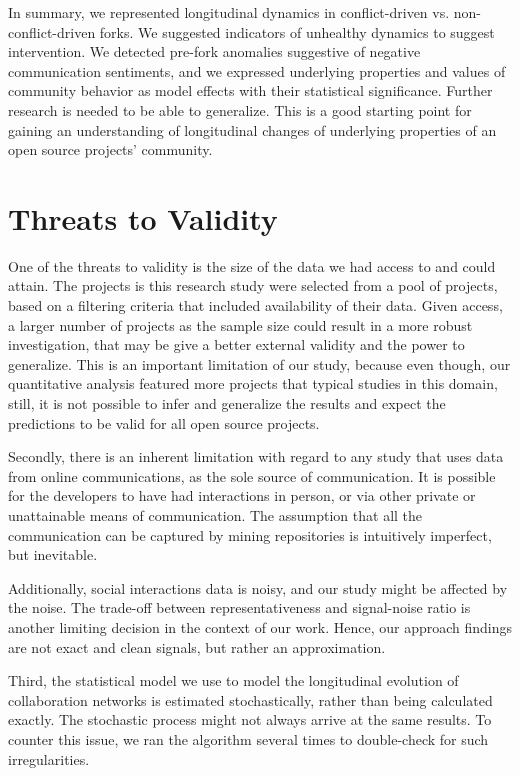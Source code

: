 \documentclass[12pt,letterpaper]{gthesis2}  %
\begin{document}
In summary, we represented longitudinal dynamics in conflict-driven vs. non-conflict-driven forks. We suggested indicators of unhealthy dynamics to suggest intervention. We detected pre-fork anomalies suggestive of negative communication sentiments, and we expressed underlying properties and values of community behavior as model effects with their statistical significance. Further research is needed to be able to generalize. This is a good starting point for gaining an understanding of longitudinal changes of underlying properties of an open source projects' community.\\




\pagebreak

\section{Threats to Validity}
\label{threatsToValidity}

One of the threats to validity is the size of the data we had access to and could attain. The projects is this research study were selected from a pool of projects, based on a filtering criteria that included availability of their data. Given access, a larger number of projects as the sample size could result in a more robust investigation, that may be give a better external validity and the power to generalize. This is an important limitation of our study, because even though, our quantitative analysis featured more projects that typical studies in this domain, still, it is not possible to infer and generalize the results and expect the predictions to be valid for all open source projects. 

Secondly, there is an inherent limitation with regard to any study that uses data from online communications, as the sole source of communication. It is possible for the developers to have had interactions in person, or via other private or unattainable means of communication. The assumption that all the communication can be captured by mining repositories is intuitively imperfect, but inevitable.

Additionally, social interactions data is noisy, and our study might be affected by the noise. The trade-off between representativeness and signal-noise ratio is another limiting decision in the context of our work. Hence, our approach findings are not exact and clean signals, but rather an approximation.

Third, the statistical model we use to model the longitudinal evolution of collaboration networks is estimated stochastically, rather than being calculated exactly. The stochastic process might not always arrive at the same results. To counter this issue, we ran the algorithm several times to double-check for such irregularities.
\end{document}
